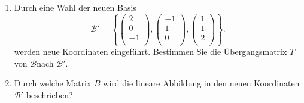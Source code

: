 \begin{enumerate}[label=\alph*)]
    \item Durch eine Wahl der neuen Basis
           \begin{equation*} 
                \mathcal{B}' = \left\{ 
                \begin{pmatrix}
                    2\\ 0\\ -1\\
                \end{pmatrix}, \begin{pmatrix}
                    -1\\ 1\\ 0\\
                \end{pmatrix}, \begin{pmatrix}
                    1\\ 1\\ 2\\
                \end{pmatrix}
                    \right\}.
            \end{equation*}
        werden neue Koordinaten eingeführt. Bestimmen Sie die Übergangsmatrix \( T \) von \( \mathcal{B}\)nach \( \mathcal{B}' \).
    \item Durch welche Matrix \( B \) wird die lineare Abbildung in den neuen Koordinaten \( \mathcal{B}'\) beschrieben?
\end{enumerate}

\vspace{1\baselineskip}

